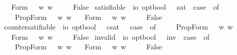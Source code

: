 \begin{isabellebody}
\ \ {\isacharbar}\ Form\ {\isasympsi}\ {\isasymRightarrow}\ {\isasymforall}w{\isachardot}{\isacharparenleft}{\isasympsi}\ w{\isacharparenright}\isanewline
\ \ {\isacharbar}\ {\isacharunderscore}\ {\isasymRightarrow}\ False{\isachardoublequoteclose}\isanewline
{}\isamarkupfalse%
\ satisfiable\ {\isacharcolon}{\isacharcolon}\ {\isachardoublequoteopen}io\ opt{\isasymRightarrow}bool{\isachardoublequoteclose}\ \ \ {\isachardoublequoteopen}{\isacharbrackleft}{\isasymphi}{\isacharbrackright}\isactrlsup s\isactrlsup a\isactrlsup t\ {\isasymequiv}\ case\ {\isasymphi}\ of\ \isanewline
\ \ \ \ PropForm\ {\isasympsi}\ {\isasymRightarrow}\ {\isasymexists}w{\isachardot}{\isacharparenleft}{\isasympsi}\ w{\isacharparenright}\isanewline
\ \ {\isacharbar}\ Form\ {\isasympsi}\ {\isasymRightarrow}\ {\isasymexists}w{\isachardot}{\isacharparenleft}{\isasympsi}\ w{\isacharparenright}\isanewline
\ \ {\isacharbar}\ {\isacharunderscore}\ {\isasymRightarrow}\ False{\isachardoublequoteclose}\isanewline
{}\isamarkupfalse%
\ countersatifiable\ {\isacharcolon}{\isacharcolon}\ {\isachardoublequoteopen}io\ opt{\isasymRightarrow}bool{\isachardoublequoteclose}\ \ \ {\isachardoublequoteopen}{\isacharbrackleft}{\isasymphi}{\isacharbrackright}\isactrlsup c\isactrlsup s\isactrlsup a\isactrlsup t\ {\isasymequiv}\ \ case\ {\isasymphi}\ of\ \isanewline
\ \ \ \ PropForm\ {\isasympsi}\ {\isasymRightarrow}\ {\isasymexists}w{\isachardot}{\isasymnot}{\isacharparenleft}{\isasympsi}\ w{\isacharparenright}\isanewline
\ \ {\isacharbar}\ Form\ {\isasympsi}\ {\isasymRightarrow}\ {\isasymexists}w{\isachardot}{\isasymnot}{\isacharparenleft}{\isasympsi}\ w{\isacharparenright}\isanewline
\ \ {\isacharbar}\ {\isacharunderscore}\ {\isasymRightarrow}\ False{\isachardoublequoteclose}\isanewline
{}\isamarkupfalse%
\ invalid\ {\isacharcolon}{\isacharcolon}\ {\isachardoublequoteopen}io\ opt{\isasymRightarrow}bool{\isachardoublequoteclose}\ \ \ {\isachardoublequoteopen}{\isacharbrackleft}{\isasymphi}{\isacharbrackright}\isactrlsup i\isactrlsup n\isactrlsup v\ {\isasymequiv}\ case\ {\isasymphi}\ of\ \isanewline
\ \ \ \ PropForm\ {\isasympsi}\ {\isasymRightarrow}\ {\isasymforall}w{\isachardot}{\isasymnot}{\isacharparenleft}{\isasympsi}\ w{\isacharparenright}\isanewline
\ \ {\isacharbar}\ Form\ {\isasympsi}\ {\isasymRightarrow}\ {\isasymforall}w{\isachardot}{\isasymnot}{\isacharparenleft}{\isasympsi}\ w{\isacharparenright}\isanewline
\ \ {\isacharbar}\ {\isacharunderscore}\ {\isasymRightarrow}\ False{\isachardoublequoteclose}%

\end{isabellebody}
